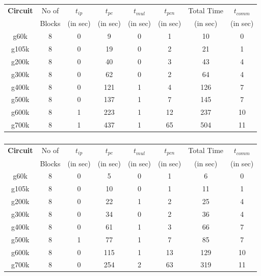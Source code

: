 \documentclass[10pt,psfig,letterpaper,twocolumn]{article}
\begin{document}
\subsubsection*{}
\begin{table}[!ht]
\begin{center}
\begin{tabular}{|c|c|c|c|c|c|c|c|} 
\hline
{\bf Circuit} & No of & $t_{ip}$ & $t_{pc}$ & $t_{mul}$ &  $t_{pcn}$ & Total Time & $t_{comm}$ \\ 
              & Blocks& (in sec)& (in sec)  & (in sec)  &  (in sec)  & (in sec)   & (in sec)   \\ \hline 
g60k&  8 & 0 &  9& 0& 1& 10& 0\\ \hline 
g105k& 8 & 0 & 19& 0& 2& 21& 1\\ \hline 
g200k& 8 & 0 & 40& 0& 3& 43& 4\\ \hline 
g300k& 8 & 0 & 62& 0& 2& 64& 4\\ \hline 
g400k& 8 & 0 & 121&1& 4& 126&7\\ \hline 
g500k& 8 & 0 & 137&1& 7& 145&7\\ \hline 
g600k& 8 & 1 & 223&1& 12&237&10\\ \hline 
g700k& 8 & 1 & 437&1& 65&504&11\\ \hline 
\end {tabular}
\end {center}
\end {table}
\subsubsection*{}
\begin{table}[!ht]
\begin{center}
\begin{tabular}{|c|c|c|c|c|c|c|c|} 
\hline
{\bf Circuit} & No of & $t_{ip}$ & $t_{pc}$ & $t_{mul}$ &  $t_{pcn}$ & Total Time & $t_{comm}$ \\ 
              & Blocks& (in sec)& (in sec)  & (in sec)  &  (in sec)  & (in sec)   & (in sec)   \\ \hline 
g60k& 8 & 0 &  5& 0&1&  6& 0     \\ \hline 
g105k&8 & 0 & 10& 0&1& 11& 1     \\ \hline 
g200k&8 & 0 & 22& 1&2& 25& 4     \\ \hline 
g300k&8 & 0 & 34& 0&2& 36& 4   \\ \hline 
g400k&8 & 0 & 61& 1&3& 66& 7   \\ \hline 
g500k&8 & 1 & 77& 1&7& 85& 7   \\ \hline 
g600k&8 & 0 & 115&1&13&129&10 \\ \hline 
g700k&8 & 0 & 254&2&63&319&11 \\ \hline 
\end {tabular}
\end {center}
\end {table}
\clearpage
\end{document}
